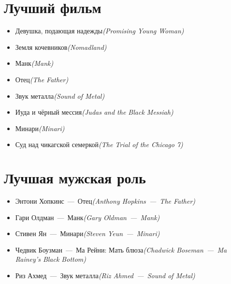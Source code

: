 \documentclass[a4paper,10pt]{article}
\begin{document}
	
\begin{multicols}{2}

\section{Лучший фильм}

\begin{itemize}
	\item Девушка, подающая надежды\newline\textit{(Promising Young Woman)}
	\item Земля кочевников\newline\textit{(Nomadland)}
	\item Манк\newline\textit{(Mank)}
	\item Отец\newline\textit{(The Father)}
	\item Звук металла\newline\textit{(Sound of Metal)}
	\item Иуда и чёрный мессия\newline\textit{(Judas and the Black Messiah)}
	\item Минари\newline\textit{(Minari)}
	\item Суд над чикагской семеркой\newline\textit{(The Trial of the Chicago 7)}
\end{itemize}

\section{Лучшая мужская роль}

\begin{itemize}
	\item Энтони Хопкинс — Отец\newline\textit{(Anthony Hopkins — The Father)}
	\item Гари Олдман — Манк\newline\textit{(Gary Oldman — Mank)}
	\item Стивен Ян — Минари\newline\textit{(Steven Yeun — Minari)}
	\item Чедвик Боузман — Ма Рейни: Мать блюза\newline\textit{(Chadwick Boseman — Ma Rainey's Black Bottom)}
	\item Риз Ахмед — Звук металла\newline\textit{(Riz Ahmed — Sound of Metal)}
\end{itemize}


\end{multicols}
\end{document}
